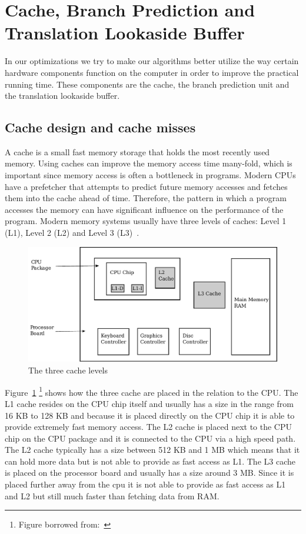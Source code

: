 \section{Cache, Branch Prediction and Translation Lookaside Buffer}
In our optimizations we try to make our algorithms better utilize the way certain hardware components function on the computer in order to improve the practical running time. 
These components are the cache, the branch prediction unit and the translation lookaside buffer.


\subsection{Cache design and cache misses}
A cache is a small fast memory storage that holds the most recently used memory.
Using caches can improve the memory access time many-fold, which is important since memory access is often a bottleneck in programs.
Modern CPUs have a prefetcher that attempts to predict future memory accesses and fetches them into the cache ahead of time.
Therefore, the pattern in which a program accesses the memory can have significant influence on the performance of the program.
Modern memory systems usually have three levels of caches: Level 1 (L1), Level 2 (L2) and Level 3 (L3)~.

\begin{figure}
\includegraphics[width=\textwidth]{CacheLevels.pdf}
\caption{The three cache levels}
\label{fig:CacheLevels}
\end{figure}

Figure~\ref{fig:CacheLevels} \footnote{Figure borrowed from:~} shows how the three cache are placed in the relation to the CPU. 
The L1 cache resides on the CPU chip itself and usually has a size in the range from 16 KB to 128 KB and because it is placed directly on the CPU chip it is able to provide extremely fast memory access.
The L2 cache is placed next to the CPU chip on the CPU package and it is connected to the CPU via a high speed path. The L2 cache typically has a size between 512 KB and 1 MB which means that it can hold more data but is not able to provide as fast access as L1.
The L3 cache is placed on the processor board and usually has a size around 3 MB. 
Since it is placed further away from the cpu it is not able to provide as fast access as L1 and L2 but still much faster than fetching data from RAM.


